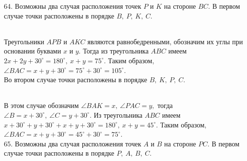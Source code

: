 \documentclass[12pt]{article}
\begin{document}
64. Возможны два случая расположения точек $P$ и $K$ на стороне $BC.$ В первом случае точки расположены в порядке $B,\ P,\ K,\ C.$
\begin{figure}[ht!]
\end{figure}\\
Треугольники $APB$ и $AKC$ являются равнобедренными, обозначим их углы при основании буквами $x$ и $y.$ Тогда из треугольника $ABC$ имеем $2x+2y+30^\circ=180^\circ,\ x+y=75^\circ.$ Таким образом, $\angle BAC=x+y+30^\circ=75^\circ+30^\circ=105^\circ.$\\
Во втором случае точки расположены в порядке $B,\ K,\ P,\ C.$
\begin{figure}[ht!]
\end{figure}\\
В этом случае обозначим $\angle BAK=x,\ \angle PAC=y,$ тогда $\angle B=x+30^\circ,\ \angle C=y+30^\circ.$ Из треугольника $ABC$ имеем $x+30^\circ+y+30^\circ+x+y+30^\circ=180^\circ,\ x+y=45^\circ.$ Таким образом, $\angle BAC=x+y+30^\circ=45^\circ+30^\circ=75^\circ.$\\
65. Возможны два случая расположения точек $A$ и $B$ на стороне $PC.$ В первом случае точки расположены в порядке $P,\ A,\ B,\ C.$
\end{document}
